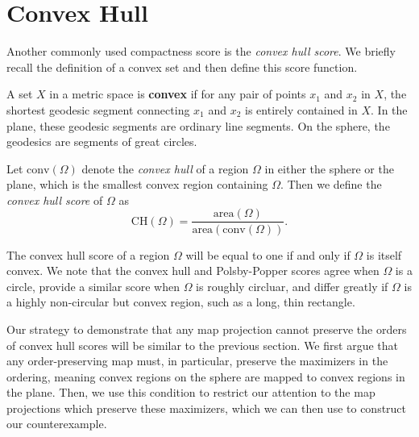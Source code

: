 \section{Convex Hull}\label{sec:ch}

Another commonly used compactness score is the \textit{convex hull score}.  We briefly recall the definition of a convex set and then define this score function.

\begin{definition}
A set $X$ in a metric space is \textbf{convex} if for any pair of points $x_1$ and $x_2$ in $X$, the shortest geodesic segment connecting $x_1$ and $x_2$ is entirely contained in $X$.  In the plane, these geodesic segments are ordinary line segments.  On the sphere, the geodesics are segments of great circles.
\end{definition}


\begin{definition}
Let $\mathrm{conv}(\Omega)$ denote the \textit{convex hull} of a region $\Omega$ in either the sphere or the plane, which is the smallest convex region containing $\Omega$.  Then we define the \textit{convex hull score} of $\Omega$ as $$\mathrm{CH}(\Omega)= \frac{\mathrm{area}(\Omega)}{\mathrm{area}(\mathrm{conv}(\Omega))}.$$
\end{definition}

The convex hull score of a region $\Omega$  will be equal to one if and only if $\Omega$ is itself convex.  We note that the convex hull and Polsby-Popper scores agree when $\Omega$ is a circle, provide a similar score when $\Omega$ is roughly circluar, and differ greatly if $\Omega$ is a highly non-circular but convex region, such as a long, thin rectangle.


Our strategy to demonstrate that any map projection cannot preserve the orders of convex hull scores will be similar to the previous section.  We first argue that any order-preserving map must, in particular, preserve the maximizers in the ordering, meaning convex regions on the sphere are mapped to convex regions in the plane.  Then, we use this condition to restrict our attention to the map projections which preserve these maximizers, which we can then use to construct our counterexample.

